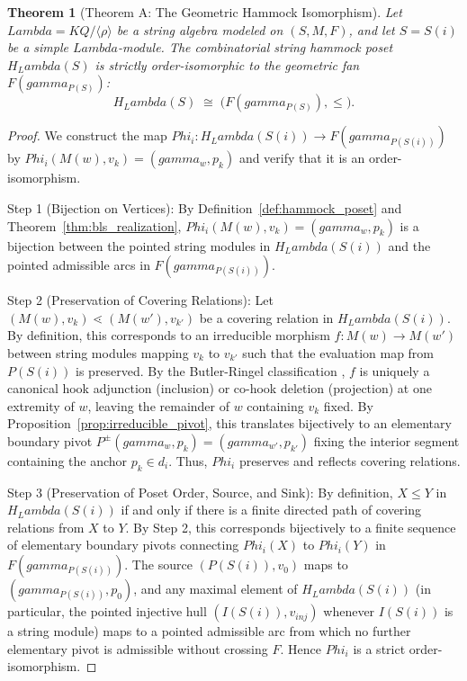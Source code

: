 \documentclass[11pt,a4paper,reqno]{amsart}
\def\mathcal#1{#1}%
\def\mathbb#1{#1}%
\def\mathrm#1{#1}%
\def\K{K}%
\def\forb{F}%
\def\gamma{gamma}%
\def\Phi{Phi}%
\def\Lambda{Lambda}%
\def\emph#1{#1}%
\newtheorem{theorem}{Theorem}[section]
\theoremstyle{definition}
\theoremstyle{remark}
\newcommand{\K}{\mathbb{K}}
\newcommand{\forb}{\mathfrak{F}}
\begin{document}
\begin{theorem}[Theorem A: The Geometric Hammock Isomorphism]
\label{thm:geometric_hammock_iso}
Let $\Lambda = \K\mathcal{Q}/\langle\rho\rangle$ be a string algebra modeled on $(\mathcal{S}, \mathcal{M}, \forb)$, and let $S = S(i)$ be a simple $\Lambda$-module. The combinatorial string hammock poset $H_\Lambda(S)$ is strictly order-isomorphic to the geometric fan $\mathcal{F}(\gamma_{P(S)})$:
\[
H_\Lambda(S) \;\cong\; \bigl(\mathcal{F}(\gamma_{P(S)}), \le\bigr).
\]
\end{theorem}

\begin{proof}
We construct the map $\Phi_i \colon H_\Lambda(S(i)) \to \mathcal{F}(\gamma_{P(S(i))})$ by $\Phi_i(M(w), v_k) = (\gamma_w, p_k)$ and verify that it is an order-isomorphism.

\emph{Step 1 (Bijection on Vertices):} By Definition~\ref{def:hammock_poset} and Theorem~\ref{thm:bls_realization}, $\Phi_i(M(w), v_k) = (\gamma_w, p_k)$ is a bijection between the pointed string modules in $H_\Lambda(S(i))$ and the pointed admissible arcs in $\mathcal{F}(\gamma_{P(S(i))})$.

\emph{Step 2 (Preservation of Covering Relations):} Let $(M(w), v_k) \lessdot (M(w'), v_{k'})$ be a covering relation in $H_\Lambda(S(i))$. By definition, this corresponds to an irreducible morphism $f \colon M(w) \to M(w')$ between string modules mapping $v_k$ to $v_{k'}$ such that the evaluation map from $P(S(i))$ is preserved. By the Butler-Ringel classification \cite{ButlerRingel1987}, $f$ is uniquely a canonical hook adjunction (inclusion) or co-hook deletion (projection) at one extremity of $w$, leaving the remainder of $w$ containing $v_k$ fixed. By Proposition~\ref{prop:irreducible_pivot}, this translates bijectively to an elementary boundary pivot $P^{\pm}(\gamma_w, p_k) = (\gamma_{w'}, p_{k'})$ fixing the interior segment containing the anchor $p_k \in d_i$. Thus, $\Phi_i$ preserves and reflects covering relations.

\emph{Step 3 (Preservation of Poset Order, Source, and Sink):} By definition, $X \le Y$ in $H_\Lambda(S(i))$ if and only if there is a finite directed path of covering relations from $X$ to $Y$. By Step 2, this corresponds bijectively to a finite sequence of elementary boundary pivots connecting $\Phi_i(X)$ to $\Phi_i(Y)$ in $\mathcal{F}(\gamma_{P(S(i))})$. The source $(P(S(i)), v_0)$ maps to $(\gamma_{P(S(i))}, p_0)$, and any maximal element of $H_\Lambda(S(i))$ (in particular, the pointed injective hull $(I(S(i)), v_{\mathrm{inj}})$ whenever $I(S(i))$ is a string module) maps to a pointed admissible arc from which no further elementary pivot is admissible without crossing $\forb$. Hence $\Phi_i$ is a strict order-isomorphism.
\end{proof}
\end{document}
